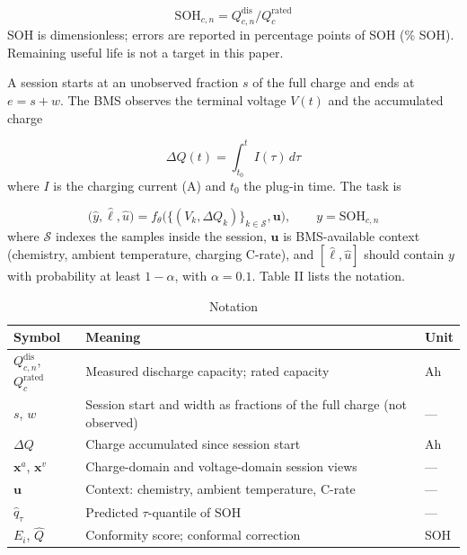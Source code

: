 \documentclass[journal]{IEEEtran}
\begin{document}
\begin{equation}
\mathrm{SOH}_{c,n}=Q^{\mathrm{dis}}_{c,n}/Q^{\mathrm{rated}}_c
\label{eq:1}
\end{equation}
SOH is dimensionless; errors are reported in percentage points of SOH (\% SOH). Remaining useful life is not a target in this paper.

A session starts at an unobserved fraction \(s\) of the full charge and ends at \(e=s+w\). The BMS observes the terminal voltage \(V(t)\) and the accumulated charge

\begin{equation}
\Delta Q(t)=\int_{t_0}^{t} I(\tau)\,d\tau
\label{eq:2}
\end{equation}
where \(I\) is the charging current (A) and \(t_0\) the plug-in time. The task is

\begin{equation}
\big(\hat{y},\hat{\ell},\hat{u}\big)=f_\theta\big(\{(V_k,\Delta Q_k)\}_{k\in\mathcal{S}},\mathbf{u}\big),\qquad y=\mathrm{SOH}_{c,n}
\label{eq:3}
\end{equation}
where \(\mathcal{S}\) indexes the samples inside the session, \(\mathbf{u}\) is BMS-available context (chemistry, ambient temperature, charging C-rate), and \([\hat{\ell},\hat{u}]\) should contain \(y\) with probability at least \(1-\alpha\), with \(\alpha=0.1\). Table II lists the notation.

\begin{table}[!t]
\centering
\caption{Notation}
\label{tab:2}
\scriptsize
\begin{tabularx}{\columnwidth}{@{}>{\raggedright\arraybackslash}X>{\raggedright\arraybackslash}X>{\raggedright\arraybackslash}X@{}}
\toprule
Symbol & Meaning & Unit \\
\midrule
\(Q^{\mathrm{dis}}_{c,n}\), \(Q^{\mathrm{rated}}_c\) & Measured discharge capacity; rated capacity & Ah \\
\(s\), \(w\) & Session start and width as fractions of the full charge (not observed) & --- \\
\(\Delta Q\) & Charge accumulated since session start & Ah \\
\(\mathbf{x}^{a}\), \(\mathbf{x}^{v}\) & Charge-domain and voltage-domain session views & --- \\
\(\mathbf{u}\) & Context: chemistry, ambient temperature, C-rate & --- \\
\(\hat{q}_\tau\) & Predicted \(\tau\)-quantile of SOH & --- \\
\(E_i\), \(\hat{Q}\) & Conformity score; conformal correction & SOH \\
\bottomrule
\end{tabularx}
\end{table}
\end{document}
